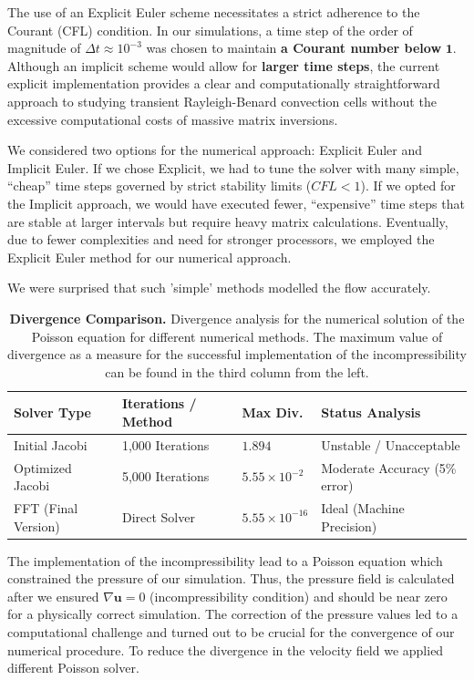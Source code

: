The use of an Explicit Euler scheme necessitates a strict adherence to the Courant (CFL) condition. In our simulations, a time step of the order of magnitude of $\Delta t \approx 10^{-3}$ was chosen to maintain \textbf{a Courant number below} $\mathbf{1}$. Although an implicit scheme would allow for \textbf{larger time steps}, the current explicit implementation provides a clear and computationally straightforward approach to studying transient Rayleigh-Benard convection cells without the excessive computational costs of massive matrix inversions.

We considered two options for the numerical approach: Explicit Euler and Implicit Euler. If we chose Explicit, we had to tune the solver with many simple, ``cheap'' time steps governed by strict stability limits ($CFL < 1$). If we opted for the Implicit approach, we would have executed fewer, ``expensive'' time steps that are stable at larger intervals but require heavy matrix calculations. Eventually, due to fewer complexities and need for stronger processors, we employed the Explicit Euler method for our numerical approach.

We were surprised that such 'simple' methods modelled the flow accurately.


\begin{table}[H]
    
    \centering
    
    \begin{tabular}{llll}
        \toprule
        \textbf{Solver Type} & \textbf{Iterations / Method} & \textbf{Max Div.} & \textbf{Status Analysis} \\
        \midrule
        Initial Jacobi      & 1,000 Iterations & $1.894$                   & Unstable / Unacceptable \\
        Optimized Jacobi    & 5,000 Iterations & $5.55 \times 10^{-2}$     & Moderate Accuracy (5\% error) \\
        FFT (Final Version) & Direct Solver    & $5.55 \times 10^{-16}$    & Ideal (Machine Precision) \\
        \bottomrule
    \end{tabular}
    \caption[Divergence Comparison]{\textbf{Divergence Comparison.} Divergence analysis for the numerical solution of the Poisson equation for different numerical methods. The maximum value of divergence as a measure for the successful implementation of the incompressibility can be found in the third column from the left.}
    \label{tab:divcomparison}
\end{table}
The implementation of the incompressibility lead to a Poisson equation which constrained the pressure of our simulation.
Thus, the pressure field is calculated after we ensured $\nabla \textbf{u} = 0$ (incompressibility condition) and should be near zero for a physically correct simulation.
The correction of the pressure values led to a computational challenge and turned out to be crucial for the convergence of our numerical procedure.
To reduce the divergence in the velocity field we applied different Poisson solver.
 
